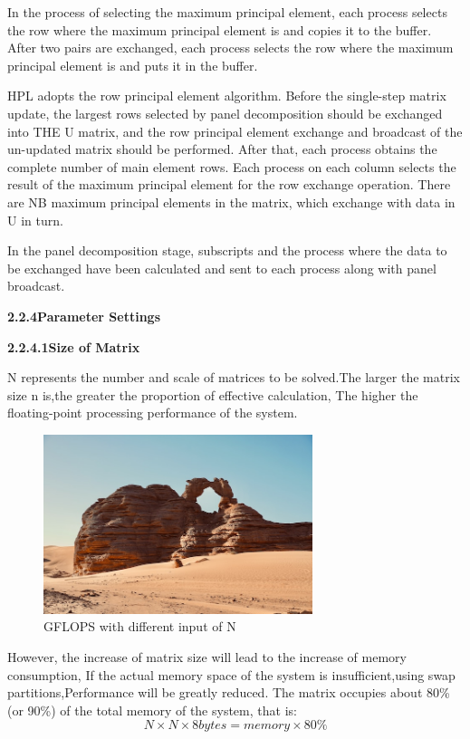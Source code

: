 \documentclass[a4paper,12pt]{article}
\begin{document}
In the process of selecting the maximum principal element, each process selects the row where the maximum principal element is and copies it to the buffer. After two pairs are exchanged, each process selects the row where the maximum principal element is and puts it in the buffer.

HPL adopts the row principal element algorithm. Before the single-step matrix update, the largest rows selected by panel decomposition should be exchanged into THE U matrix, and the row principal element exchange and broadcast of the un-updated matrix should be performed. After that, each process obtains the complete number of main element rows. Each process on each column selects the result of the maximum principal element for the row exchange operation. There are NB maximum principal elements in the matrix, which exchange with data in U in turn.

In the panel decomposition stage, subscripts and the process where the data to be exchanged have been calculated and sent to each process along with panel broadcast.

\textbf{2.2.4Parameter Settings}

\textbf{2.2.4.1Size of Matrix}

N represents the number and scale of matrices to be solved.The larger the matrix size n is,the greater the proportion of effective calculation, The higher the floating-point processing performance of the system.

\begin{figure}[H]
    \centering
    \includegraphics[width=0.7\textwidth]{GFLOPS_N.png}
    \caption{GFLOPS with different input of N}
    \label{fig:gflops_n}
\end{figure}

However, the increase of matrix size will lead to the increase of memory consumption, If the actual memory space of the system is insufficient,using swap partitions,Performance will be greatly reduced. The matrix occupies about 80\% (or 90\%) of the total memory of the system, that is:
\begin{equation*}
N \times N \times 8bytes = memory \times 80\%
\end{equation*}
\end{document}
